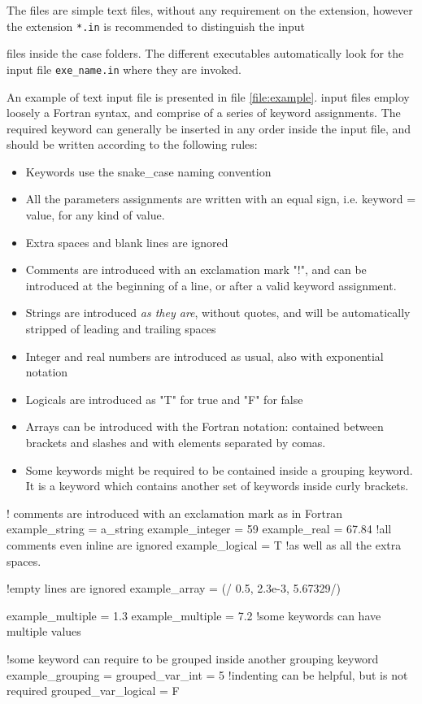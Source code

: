 The files are simple text files, without any requirement on the extension, 
however the extension \texttt{*.in} is recommended to distinguish the input 

files inside the case folders. The different executables automatically look 
for the input file \texttt{exe\_name.in} where they are invoked. 

An example of text input file is presented in file \ref{file:example}. 
input files employ loosely a Fortran syntax, and comprise of a series of 
keyword assignments.
The required keyword can generally be inserted in any order inside the input file, 
and should be written according to the following rules:
\begin{itemize}
\item Keywords use the snake_case naming convention
\item All the parameters assignments are written with an equal sign, i.e. keyword = value, 
for any kind of value.
\item Extra spaces and blank lines are ignored
\item Comments are introduced with an exclamation mark "!", and can be introduced 
at the beginning of a line, or after a valid keyword assignment.
\item Strings are introduced \emph{as they are}, without quotes, and will be 
automatically stripped of leading and trailing spaces
\item Integer and real numbers are introduced as usual, also with exponential notation
\item Logicals are introduced as "T" for true and "F" for false
\item Arrays can be introduced with the Fortran notation: contained between brackets 
and slashes and with elements separated by comas. 
\item Some keywords might be required to be contained inside a grouping keyword. 
It is a keyword which contains another set of keywords inside curly brackets. 
\end{itemize}

\begin{inputfile}[frame=single, caption={example input file}, label={file:example}]
! comments are introduced with an exclamation mark as in Fortran
example_string   = a_string
example_integer  = 59
example_real     = 67.84 !all comments even inline are ignored
example_logical  = T     !as well as all the extra spaces.

!empty lines are ignored
example_array = (/ 0.5, 2.3e-3, 5.67329/)

example_multiple = 1.3
example_multiple = 7.2 !some keywords can have multiple values

!some keyword can require to be grouped inside another grouping keyword
example_grouping = {
	grouped_var_int = 5 !indenting can be helpful, but is not required
    grouped_var_logical = F
}
\end{inputfile}

